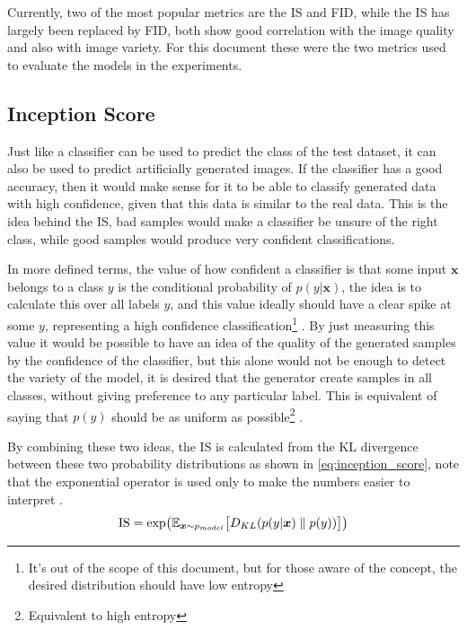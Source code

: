 Currently, two of the most popular metrics are the \gls{IS} and \gls{FID}, while the \gls{IS} has largely been replaced by \gls{FID}, both show good correlation with the image quality and also with image variety. For this document these were the two metrics used to evaluate the models in the experiments.

\subsection{Inception Score}
Just like a classifier can be used to predict the class of the test dataset, it can also be used to predict artificially generated images. If the classifier has a good accuracy, then it would make sense for it to be able to classify generated data with high confidence, given that this data is similar to the real data. This is the idea behind the \gls{IS}, bad samples would make a classifier be unsure of the right class, while good samples would produce very confident classifications.

In more defined terms, the value of how confident a classifier is that some input $\bm{x}$ belongs to a class $y$ is the conditional probability of $p(y | \bm{x})$, the idea is to calculate this over all labels $y$, and this value ideally should have a clear spike at some $y$, representing a high confidence classification\footnote{
    It's out of the scope of this document, but for those aware of the concept, the desired distribution should have low entropy
} \cite{improvedGANS2016}. By just measuring this value it would be possible to have an idea of the quality of the generated samples by the confidence of the classifier, but this alone would not be enough to detect the variety of the model, it is desired that the generator create samples in all classes, without giving preference to any particular label. This is equivalent of saying that $p(y)$ should be as uniform as possible\footnote{
    Equivalent to high entropy
} \cite{coursera_IS}.

By combining these two ideas, the \gls{IS} is calculated from the KL divergence between these two probability distributions as shown in \autoref{eq:inception_score}, note that the exponential operator is used only to make the numbers easier to interpret \cite{improvedGANS2016}.
\begin{equation} \label{eq:inception_score}
    \operatorname{IS} = \exp\bigl({\mathbb{E}_{\bm{x}\sim p_{model}}{
        \bigl\lbrack D_{KL}(p(y | \bm{x}) \;\|\; p(y)) \bigr\rbrack
    }}\bigr)
\end{equation}

